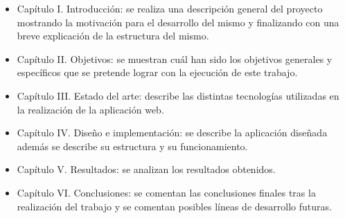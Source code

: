 \begin{itemize}
\item Capítulo I. Introducción: se realiza una descripción general del proyecto mostrando la motivación para el desarrollo del mismo y finalizando con una breve explicación de la estructura del mismo.
\item Capítulo II. Objetivos: se muestran cuál han sido los objetivos generales y específicos que se pretende lograr con la ejecución de este trabajo.
\item Capítulo III. Estado del arte: describe las distintas tecnologías utilizadas en la realización de la aplicación web.
\item Capítulo IV. Diseño e implementación: se describe la aplicación diseñada además se describe su estructura y su funcionamiento.
\item Capítulo V. Resultados: se analizan los resultados obtenidos.
\item Capítulo VI. Conclusiones:  se comentan las conclusiones finales tras la realización del trabajo y se comentan posibles líneas de desarrollo futuras.
\end{itemize}

